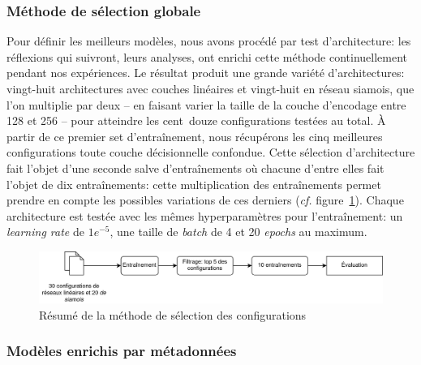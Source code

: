 \subsubsection{Méthode de sélection globale}

Pour définir les meilleurs modèles, nous avons procédé par test d'architecture: les réflexions qui suivront, leurs analyses, ont enrichi cette méthode continuellement pendant nos expériences. Le résultat produit une grande variété d'architectures: vingt-huit architectures avec couches linéaires et vingt-huit en réseau siamois, que l'on multiplie par deux -- en faisant varier la taille de la couche d'encodage entre 128 et 256 -- pour atteindre les cent~douze configurations testées au total. À partir de ce premier set d'entraînement, nous récupérons les cinq meilleures configurations toute couche décisionnelle confondue. Cette sélection d'architecture fait l'objet d'une seconde salve d'entraînements où chacune d'entre elles fait l'objet de dix entraînements: cette multiplication des entraînements permet prendre en compte les possibles variations de ces derniers (\textit{cf.} figure~\ref{fig:chap4:50configurations}). Chaque architecture est testée avec les mêmes hyperparamètres pour l'entraînement: un \textit{learning rate} de $1e^{-5}$, une taille de \textit{batch} de 4 et 20 \textit{epochs} au maximum. 

\begin{figure}[ht]
    \centering
    \includegraphics[width=\linewidth]{figures/chap4/50config.png}
    \caption{Résumé de la méthode de sélection des configurations}
    \label{fig:chap4:50configurations}
\end{figure}



\subsubsection{Modèles enrichis par métadonnées}

